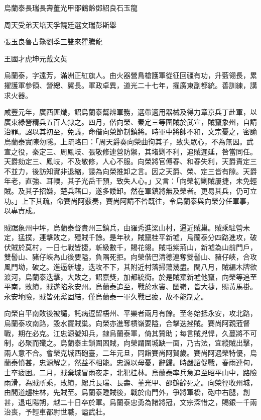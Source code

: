
\begin{pinyinscope}
烏蘭泰長瑞長壽董光甲邵鶴齡鄧紹良石玉龍

周天受弟天培天孚饒廷選文瑞彭斯舉

張玉良魯占鼇劉季三雙來瞿騰龍

王國才虎坤元戴文英

烏蘭泰，字遠芳，滿洲正紅旗人。由火器營鳥槍護軍從征回疆有功，升藍翎長，累擢護軍參領、營總、翼長。軍政卓異，道光二十七年，擢廣東副都統。善訓練，講求火器。

咸豐元年，廣西匪熾，詔烏蘭泰幫辨軍務，選帶適用器械及得力章京兵丁赴軍，以廣東綠營精兵五百人隸之。四月，偕向榮、秦定三等圍賊於武宣，賊竄象州，自請治罪。詔以其初至，免議，命偕向榮節制鎮將。時軍中將帥不和，文宗憂之，密諭烏蘭泰實陳勿隱。上疏略曰：「周天爵奏向榮曲徇其子，致失眾心，不為無因。武宣之役，秦定三、周鳳岐、張敬修連營防禦，其堵剿不利，追賊遲延，咎當同任。天爵劾定三、鳳岐，不及敬修，人心不服。向榮將官傅春、和春失利，天爵責定三不並力，後訪知實非退縮，諉為向榮推卸之言。因之天爵、榮、定三皆有隙。天爵年老，直強、耳輭，其子光岳干預，致失人心。」又言：「向榮初剿賊屢捷，未免輕賊。及其子招嫌，楚兵藉口，遂多諉卸。然在軍鎮將無及榮者。更易其兵，仍可立功。」上下其疏，命賽尚阿覈奏，賽尚阿請不咎既往，令烏蘭泰與向榮分任軍事，以專責成。

賊踞象州中坪，烏蘭泰督貴州三鎮兵，由羅秀進梁山村，逼近賊巢。賊乘駐營未定，猛撲，連擊敗之，殪賊千餘。是年秋，賊竄桂平新墟，烏蘭泰分四路進攻，破伏賊於莫村，一日七戰皆捷，斬級數千，賜花翎。賊屯紫荊山，新墟為山前門戶，雙髻山、豬仔峽為山後要隘，負隅死拒。向榮偕巴清德連奪雙髻山、豬仔峽，合攻風門坳，破之。進逼新墟，迭攻不下，其附近村落掃蕩幾盡。閏八月，賊編木牌欲渡河，烏蘭泰迭擊，大敗之，詔嘉獎，加都統銜。於是賊棄新墟他竄，向榮等追至平南，敗績，賊遂陷永安州。烏蘭泰追至，戰於水竇、圞嶺，皆大捷，賜黃馬褂。永安地險，賊皆死黨固結，僅烏蘭泰一軍久戰已疲，故不能制之。

向榮自平南敗後被譴，託病逗留梧州、平樂者兩月有餘。至冬始抵永安，攻北路，烏蘭泰攻南路，毀水竇賊巢。向榮亦進奪槓嶺要隘，合擊迭挫賊。賽尚阿親蒞督戰，期在必克。江忠源號知兵，隸烏蘭泰軍，倚其贊助；每言賊兇悍，久蔓將不可制，必聚而殲之。烏蘭泰主鎖圍困賊，向榮謂圍城缺一面，乃古法，宜縱賊出擊，兩人意不合。會榮克城西砲臺，二年元旦，同詣賽尚阿賀歲。賽尚阿遇榮特優，烏蘭泰憤甚，忠源解之，然益不相能。忠源以母憂，辭歸。時嚴詔促戰，春雨連旬，士卒疲困。二月，賊棄城冒雨夜走，北犯桂林。烏蘭泰率兵急追至昭平山中，路險雨滑，為賊所乘，敗績，總兵長瑞、長壽、董光甲、邵鶴齡死之。向榮徑收州城，由間道趨桂林，先賊至。烏蘭泰踵賊後，戰於南門外，爭將軍橋，砲中右腿，創甚，退屯陽朔，越二十日卒於軍。烏蘭泰忠勇為諸將冠，文宗深惜之，賜銀一千兩治喪，予輕車都尉世職，謚武壯。


\end{pinyinscope}
